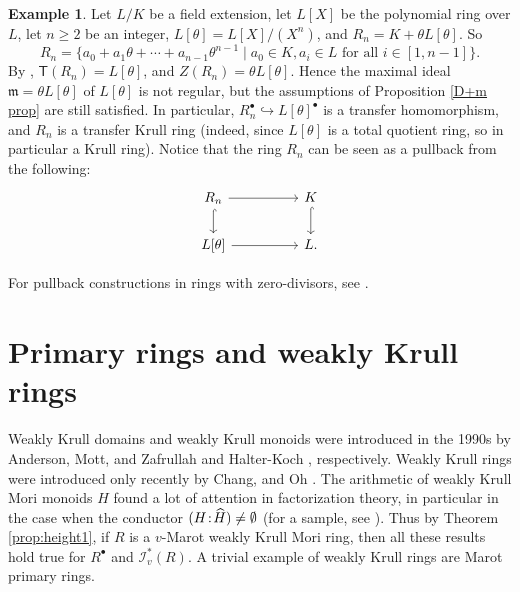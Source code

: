 \documentclass[a4paper, 10pt]{amsart}
\theoremstyle{plain}
\theoremstyle{definition}
\newtheorem{example}[theorem]{Example}
\theoremstyle{remark}
\newcommand{\DP}{\negthinspace : \negthinspace}
\numberwithin{equation}{section}
\begin{document}
\begin{example}
Let $L/K$ be a  field extension, let $L[X]$ be the polynomial ring over $L$, let
$n\ge 2$ be an integer, $L[\theta]=L[X]/(X^n)$, and $R_n=K+\theta L[\theta]$. So $$R_n=\{a_0+a_1\theta+\cdots+a_{n-1}\theta^{n-1}\mid a_0\in K,a_i\in L \text{~for all~} i \in [1, n-1]\}.$$ By \cite[Proposition 2.1]{CK23}, $\mathsf{T}(R_n)=L[\theta]$, and $Z(R_n)=\theta L[\theta].$
Hence the maximal ideal $\mathfrak{m}=\theta L[\theta]$ of $L[\theta]$ is not regular, but the assumptions of Proposition \ref{D+m prop} are still satisfied. In particular, $R_n^\bullet \hookrightarrow L[\theta]^\bullet $ is a transfer homomorphism, and $R_n$ is a transfer Krull ring (indeed, since $L[\theta]$ is a total quotient ring, so in particular a Krull ring).  Notice that the ring $R_n$ can be seen as a pullback from the following: 
\[\begin{tikzcd}
	R_n\ar[rr]\ar[d,hook] & & K \ar[d,hook] \\ L[\theta] \ar[rr] & & L.
\end{tikzcd}\] 
\end{example}
 
For pullback constructions in rings with zero-divisors, see \cite{CF21, CK23, ZCKZ24}.

\section{Primary rings and weakly Krull rings}\label{5} Weakly Krull domains and weakly Krull monoids were introduced in the 1990s by Anderson, Mott, and Zafrullah \cite{AMZ92} and Halter-Koch \cite{HK98}, respectively. Weakly Krull rings were introduced only recently by Chang, and Oh \cite{CO22}. The arithmetic of weakly Krull Mori monoids $H$ found a lot of attention in factorization theory, in particular in the case when the conductor $(H\DP \widehat{H})\ne \emptyset$ (for a sample, see \cite{CFW22, FW22, GHK06, GKR15}). Thus by Theorem \ref{prop:height1}, if $R$ is a $v$-Marot weakly Krull Mori ring, then all these results hold true for $R^\bullet$ and $\mathcal{I}_v^*(R).$ A trivial example of weakly Krull rings are Marot primary rings.
\end{document}
